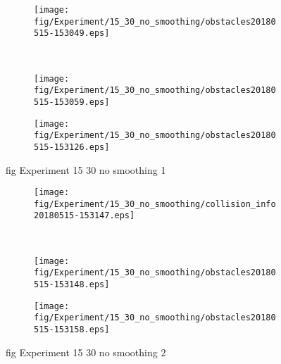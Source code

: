 \begin{figure}[H]
	\centering
	\begin{subfigure}[b]{0.45\textwidth}
		\texttt{[image: fig/Experiment/15\_30\_no\_smoothing/obstacles20180515-153049.eps]}
		\caption{}
		\label{fig:Experiment:15_30_no_smoothing:obstacles20180515-153049}
	\end{subfigure}
	~
	\begin{subfigure}[b]{0.45\textwidth}
		\texttt{[image: fig/Experiment/15\_30\_no\_smoothing/obstacles20180515-153059.eps]}
		\caption{}
		\label{fig:Experiment:15_30_no_smoothing:obstacles20180515-153059}
	\end{subfigure}

	\begin{subfigure}[b]{0.45\textwidth}
		\texttt{[image: fig/Experiment/15\_30\_no\_smoothing/obstacles20180515-153126.eps]}
		\caption{}
		\label{fig:Experiment:15_30_no_smoothing:obstacles20180515-153126}
	\end{subfigure}
	\caption{fig Experiment 15 30 no smoothing 1}
	\label{fig:Experiment:15_30_no_smoothing:1}
\end{figure}

\begin{figure}[H]
	\centering
	\begin{subfigure}[b]{0.45\textwidth}
		\texttt{[image: fig/Experiment/15\_30\_no\_smoothing/collision\_info20180515-153147.eps]}
		\caption{}
		\label{fig:Experiment:15_30_no_smoothing:collision_info20180515-153147}
	\end{subfigure}
	~
	\begin{subfigure}[b]{0.45\textwidth}
		\texttt{[image: fig/Experiment/15\_30\_no\_smoothing/obstacles20180515-153148.eps]}
		\caption{}
		\label{fig:Experiment:15_30_no_smoothing:obstacles20180515-153148}
	\end{subfigure}

	\begin{subfigure}[b]{0.45\textwidth}
		\texttt{[image: fig/Experiment/15\_30\_no\_smoothing/obstacles20180515-153158.eps]}
		\caption{}
		\label{fig:Experiment:15_30_no_smoothing:obstacles20180515-153158}
	\end{subfigure}
	\caption{fig Experiment 15 30 no smoothing 2}
	\label{fig:Experiment:15_30_no_smoothing:2}
\end{figure}

